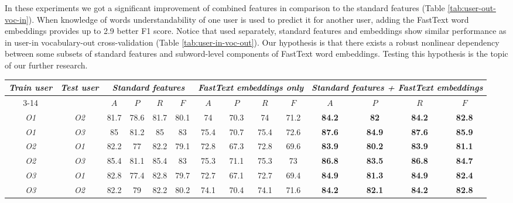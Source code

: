 In these experiments we got a significant improvement of combined features in comparison to the standard features (Table \ref{tab:user-out-voc-in}). When knowledge of words understandability of one user is used to predict it for another user, adding the FastText word embeddings provides up to 2.9 better F1 score. Notice that used separately, standard features and embeddings show similar performance as in user-in vocabulary-out cross-validation (Table \ref{tab:user-in-voc-out}). Our hypothesis is that there exists a robust nonlinear dependency between some subsets of standard features and subword-level components of FastText word embeddings. Testing this hypothesis is the topic of our further research.

\begin{table*}[h]
\begin{tabular}{cc|cccc|cccc|cccc}
\multirow{2}{0.6cm}{\textit{Train user}} & \multirow{2}{0.6cm}{\textit{Test user}} & \multicolumn{4}{c|}{\textit{Standard features}} & \multicolumn{4}{c|}{\textit{FastText embeddings only}} & \multicolumn{4}{X}{\textit{Standard features + FastText embeddings}} \\ \cline{3-14} 
 &  & $A$ & $P$ & $R$ & $F$ & $A$ & $P$ & $R$ & $F$ & $A$ & $P$ & $R$ & $F$ \\ \hline
\textit{O1} & \textit{O2} & 81.7 & 78.6 & 81.7 & 80.1 & 74 & 70.3 & 74 & 71.2 & \textbf{84.2} & \textbf{82} & \textbf{84.2} & \textbf{82.8} \\  
\textit{O1} & \textit{O3} & 85 & 81.2 & 85 & 83 & 75.4 & 70.7 & 75.4 & 72.6 & \textbf{87.6} & \textbf{84.9} & \textbf{87.6} & \textbf{85.9} \\ \hline 
\textit{O2} & \textit{O1} & 82.2 & 77 & 82.2 & 79.1 & 72.8 & 67.3 & 72.8 & 69.6 & \textbf{83.9} & \textbf{80.2} & \textbf{83.9} & \textbf{81.1} \\  
\textit{O2} & \textit{O3} & 85.4 & 81.1 & 85.4 & 83 & 75.3 & 71.1 & 75.3 & 73 & \textbf{86.8} & \textbf{83.5} & \textbf{86.8} & \textbf{84.7} \\ \hline 
\textit{O3} & \textit{O1} & 82.8 & 77.4 & 82.8 & 79.7 & 72.7 & 67.1 & 72.7 & 69.4 & \textbf{84.9} & \textbf{81.3} & \textbf{84.9} & \textbf{82.4} \\  
\textit{O3} & \textit{O2} & 82.2 & 79 & 82.2 & 80.2 & 74.1 & 70.4 & 74.1 & 71.6 & \textbf{84.2} & \textbf{82.1} & \textbf{84.2} & \textbf{82.8} \\ \hline 
\end{tabular}
    \caption{Experiments on user-out vocabulary-in cross-validation.}
    \label{tab:user-out-voc-in}
\end{table*}


